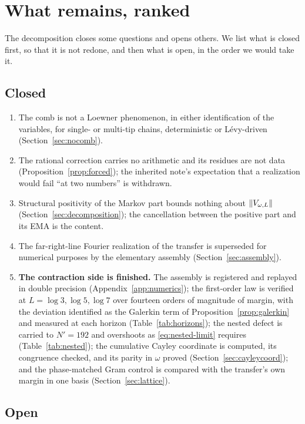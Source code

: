 \section{What remains, ranked}\label{sec:outlook}

The decomposition closes some questions and opens others. We list what is
closed first, so that it is not redone, and then what is open, in the order we
would take it.

\subsection{Closed}

\begin{enumerate}
\item The comb is not a Loewner phenomenon, in either identification of the
variables, for single- or multi-tip chains, deterministic or L\'evy-driven
(Section~\ref{sec:nocomb}).
\item The rational correction carries no arithmetic and its residues are not
data (Proposition~\ref{prop:forced}); the inherited note's expectation that a
realization would fail ``at two numbers'' is withdrawn.
\item Structural positivity of the Markov part bounds nothing about
$\lVert V_{\omega,L}\rVert$ (Section~\ref{sec:decomposition}); the cancellation
between the positive part and its EMA is the content.
\item The far-right-line Fourier realization of the transfer is superseded for
numerical purposes by the elementary assembly (Section~\ref{sec:assembly}).
\item \textbf{The contraction side is finished.} The assembly is registered and
replayed in double precision (Appendix~\ref{app:numerics}); the first-order law
is verified at $L=\log3,\log5,\log7$ over fourteen orders of magnitude of margin,
with the deviation identified as the Galerkin term of
Proposition~\ref{prop:galerkin} and measured at each horizon
(Table~\ref{tab:horizons}); the nested defect is carried to $N'=192$ and
overshoots as \eqref{eq:nested-limit} requires (Table~\ref{tab:nested}); the
cumulative Cayley coordinate is computed, its congruence checked, and its parity
in $\omega$ proved (Section~\ref{sec:cayleycoord}); and the phase-matched Gram
control is compared with the transfer's own margin in one basis
(Section~\ref{sec:lattice}).
\end{enumerate}

\subsection{Open}

